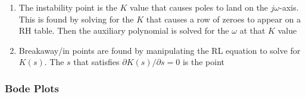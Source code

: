 \documentclass[twocolumn, 12pt]{article}    %
\begin{document}
\begin{enumerate}
        \item The instability point is the \(K\) value that causes poles to land on the \(j\omega\)-axis. This is found by solving for the \(K\) that causes a row of zeroes to appear on a RH table. Then the auxiliary polynomial is solved for the \(\omega\) at that \(K\) value
        
        
        \item Breakaway/in points are found by manipulating the RL equation to solve for \(K(s)\). The \(s\) that satisfies \(\partial K(s)/ \partial s =0\) is the point
        
    \end{enumerate}
        
\subsubsection*{Bode Plots}
\end{document}
